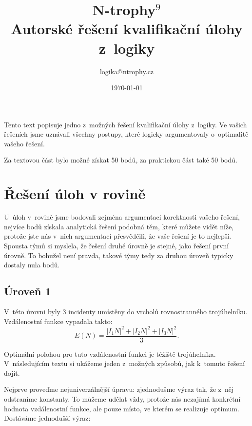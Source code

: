 \documentclass[12pt,a4paper]{article}
\begin{document}
\pagestyle{fancy}     %
\setcounter{page}{1}  %


\title{N-trophy$^9$\\Autorské řešení kvalifikační úlohy z~logiky}
\date{\today}
\author{logika@ntrophy.cz}
\maketitle

\setlength{\parindent}{0cm}
\setlength{\parskip}{3mm plus2pt minus2pt}

Tento text popisuje jedno z~možných řešení kvalifikační úlohy z~logiky. Ve
vašich řešeních jsme uznávali všechny postupy, které logicky argumentovaly
o~optimalitě vašeho řešení.

Za textovou část bylo možné získat 50 bodů, za praktickou část také 50 bodů.

\section*{Řešení úloh v rovině}

U~úloh v~rovině jsme bodovali zejména argumentaci korektnosti vašeho řešení,
nejvíce bodů získala analytická řešení podobná těm, které můžete vidět níže,
protože jste nás v~nich argumentací přesvědčili, že vaše řešení je to nejlepší.
Spousta týmů si myslela, že řešení druhé úrovně je stejné, jako řešení první
úrovně. To bohužel není pravda, takové týmy tedy za druhou úroveň typicky
dostaly nula bodů.

\subsection*{Úroveň 1}

V~této úrovni byly 3 incidenty umístěny do vrcholů rovnostranného trojúhelníku.
Vzdálenostní funkce vypadala takto:
$$E(N) = \frac{|I_1N|^2 + |I_2N|^2 + |I_3N|^2}{3}.$$

Optimální polohou pro tuto vzdálenostní funkci je těžiště trojúhelníka.
V~následujícím textu si ukážeme jeden z~možných způsobů, jak k~tomuto řešení
dojít.

Nejprve proveďme nejuniverzálnější úpravu: zjednodušme výraz tak, že z~něj
odstraníme konstanty. To můžeme udělat vždy, protože nás nezajímá konkrétní
hodnota vzdálenostní funkce, ale pouze místo, ve kterém se realizuje optimum.
Dostáváme jednodušší výraz:
\end{document}
